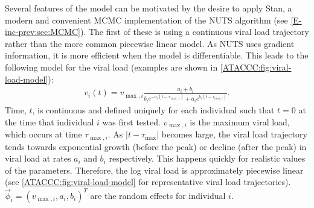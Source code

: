 \documentclass[thesis.tex]{subfiles}
\begin{document}
Several features of the \textcite{hakkiOnset} model can be motivated by the desire to apply Stan, a modern and convenient MCMC implementation of the NUTS algorithm (see \cref{E-inc-prev:sec:MCMC}).
The first of these is using a continuous viral load trajectory rather than the more common piecewise linear model.
As NUTS uses gradient information, it is more efficient when the model is differentiable.
This leads to the following model for the viral load (examples are shown in \cref{ATACCC:fig:viral-load-model}):
\begin{align}
v_i(t) = v_{\max,i} \frac{a_i+b_i}{b_ie^{-a_i(t-\tau_{\max,i})} + a_ie^{b_i(t-\tau_{max,i})}}. \label{ATACCC:eq:viral-load}
\end{align}
Time, $t$, is continuous and defined uniquely for each individual such that $t = 0$ at the time that individual $i$ was first tested.
$v_{\max,i}$ is the maximum viral load, which occurs at time $\tau_{\max,i}$.
As $\lvert t - \tau_{\max} \rvert$ becomes large, the viral load trajectory tends towards exponential growth (before the peak) or decline (after the peak) in viral load at rates $a_i$ and $b_i$ respectively.
This happens quickly for realistic values of the parameters.
Therefore, the log viral load is approximately piecewise linear (see \cref{ATACCC:fig:viral-load-model} for representative viral load trajectories).
$\vec{\phi}_i = (v_{\max,i}, a_i, b_i)^T$ are the random effects for individual $i$.
\end{document}
